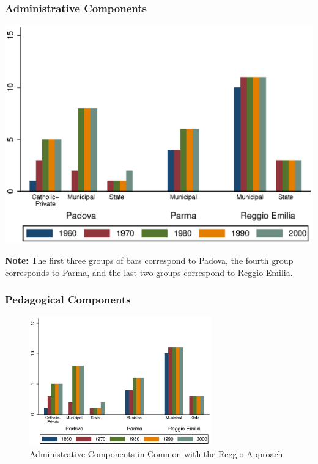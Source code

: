 \documentclass[static]{JJH-Beamer_PAGENOS}
\begin{document}
\begin{frame}
\frametitle{Administrative Components}
\begin{center}
\includegraphics[scale=0.7]{../../output/aggregatePedagogical.eps}
\end{center}
\tiny{\textbf{Note:} The first three groups of bars correspond to Padova, the fourth group corresponds to Parma, and the last two groups correspond to Reggio Emilia.}
 
\frametitle{Pedagogical Components}
\centering
\begin{figure}[H]
\caption{Administrative Components in Common with the Reggio Approach}
\includegraphics[width=0.7\textwidth]{../../output/aggregatePedagogical.eps}
\end{figure}
\end{frame}


\end{document}
